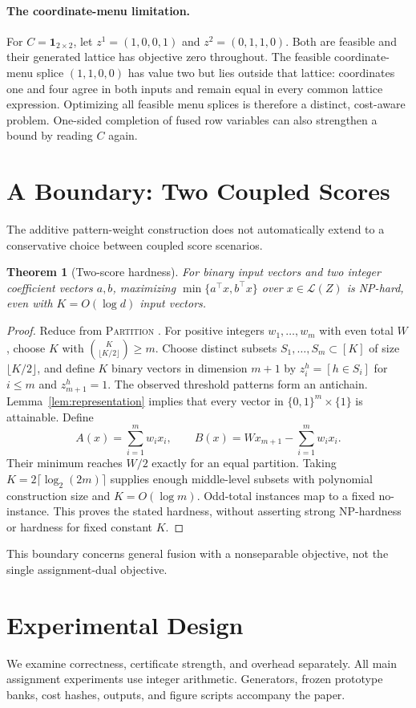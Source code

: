 \documentclass[10pt,letterpaper]{article}
\newtheorem{theorem}{Theorem}[section]
\newcommand{\lat}{\mathcal{L}}
\newcommand{\one}{\mathbf{1}}
\begin{document}
\paragraph{The coordinate-menu limitation.}
For $C=\one_{2\times2}$, let $z^1=(1,0,0,1)$ and $z^2=(0,1,1,0)$. Both are feasible and their generated lattice has objective zero throughout. The feasible coordinate-menu splice $(1,1,0,0)$ has value two but lies outside that lattice: coordinates one and four agree in both inputs and remain equal in every common lattice expression. Optimizing all feasible menu splices is therefore a distinct, cost-aware problem. One-sided completion of fused row variables can also strengthen a bound by reading $C$ again.

\section{A Boundary: Two Coupled Scores}
The additive pattern-weight construction does not automatically extend to a conservative choice between coupled score scenarios.
\begin{theorem}[Two-score hardness]
For binary input vectors and two integer coefficient vectors $a,b$, maximizing $\min\{a^\top x,b^\top x\}$ over $x\in\lat(Z)$ is NP-hard, even with $K=O(\log d)$ input vectors.
\end{theorem}
\begin{proof}
Reduce from \textsc{Partition} \citep{karp}. For positive integers $w_1,\ldots,w_m$ with even total $W$, choose $K$ with $\binom{K}{\lfloor K/2\rfloor}\geq m$. Choose distinct subsets $S_1,\ldots,S_m\subset[K]$ of size $\lfloor K/2\rfloor$, and define $K$ binary vectors in dimension $m+1$ by $z^h_i=[h\in S_i]$ for $i\leq m$ and $z^h_{m+1}=1$. The observed threshold patterns form an antichain. Lemma~\ref{lem:representation} implies that every vector in $\{0,1\}^m\times\{1\}$ is attainable. Define
\[
 A(x)=\sum_{i=1}^m w_ix_i,\qquad
 B(x)=Wx_{m+1}-\sum_{i=1}^m w_ix_i.
\]
Their minimum reaches $W/2$ exactly for an equal partition. Taking $K=2\lceil\log_2(2m)\rceil$ supplies enough middle-level subsets with polynomial construction size and $K=O(\log m)$. Odd-total instances map to a fixed no-instance. This proves the stated hardness, without asserting strong NP-hardness or hardness for fixed constant $K$.
\end{proof}
This boundary concerns general fusion with a nonseparable objective, not the single assignment-dual objective.

\section{Experimental Design}
We examine correctness, certificate strength, and overhead separately. All main assignment experiments use integer arithmetic. Generators, frozen prototype banks, cost hashes, outputs, and figure scripts accompany the paper.
\end{document}
